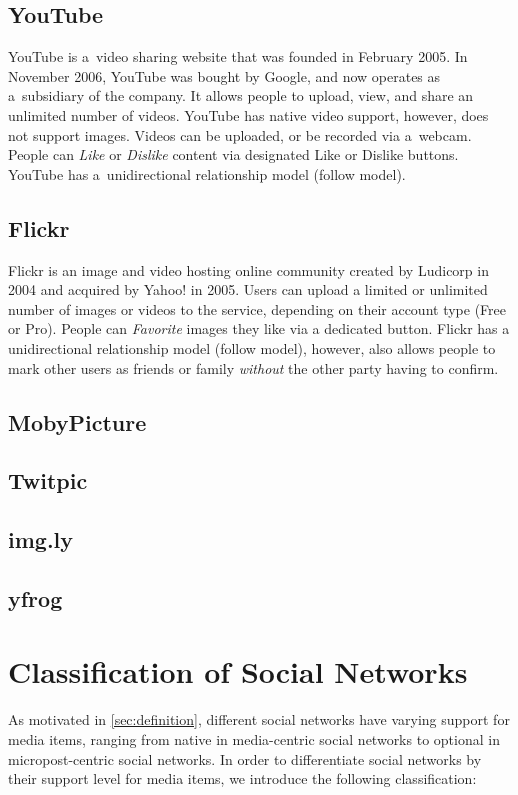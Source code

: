 \subsection{YouTube}
YouTube is a~video sharing website that was founded in February 2005.
In November 2006, YouTube was bought by Google,
and now operates as a~subsidiary of the company.
It allows people to upload, view, and share an unlimited number of videos.
YouTube has native video support, however, does not support images.
Videos can be uploaded, or be recorded via a~webcam.
People can \emph{Like} or \emph{Dislike} content via designated Like or Dislike buttons.
YouTube has a~unidirectional relationship model (follow model).

\subsection{Flickr}
Flickr is an image and video hosting online community created by Ludicorp in 2004
and acquired by Yahoo! in 2005.
Users can upload a limited or unlimited number of images or videos to the service,
depending on their account type (Free or Pro). 
People can \emph{Favorite} images they like via a dedicated button.
Flickr has a unidirectional relationship model (follow model), however,
also allows people to mark other users as friends or family \emph{without}
the other party having to confirm.

\subsection{MobyPicture}

\subsection{Twitpic}

\subsection{img.ly}

\subsection{yfrog}

\section{Classification of Social Networks}
As motivated in \autoref{sec:definition}, different social networks have varying support
for media items, ranging from native in media-centric social networks
to optional in micropost-centric social networks.
In order to differentiate social networks by their support level for media items,
we introduce the following classification:

